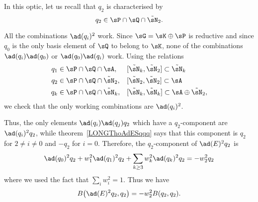 In this optic, let us recall that $q_2$ is characterised by
\begin{equation}
	q_2\in\sP\cap\sQ\cap\tilde\sN_2.
\end{equation}

All the combinations $\ad(q_i)^2$ work. Since $\sG=\sK\oplus\sP$ is reductive and since $q_0$ is the only basis element of $\sQ$ to belong to $\sK$, none of the combinations $\ad(q_i)\ad(q_0)$ or $\ad(q_0)\ad(q_i)$ work. Using the relations
%
\begin{equation}
	\begin{aligned}[]
		q_1 & \in\sP\cap\sQ\cap\sA    ,     &  & [\tilde\sN_k,\tilde\sN_2]\subset\tilde\sN_k           \\
		q_2 & \in\sP\cap\sQ\cap\tilde\sN_2, &  & [\tilde\sN_2,\tilde\sN_2]\subset\sA                   \\
		q_k & \in\sP\cap\sQ\cap\tilde\sN_k, &  & [\tilde\sN_k,\tilde\sN_k]\subset\sA\oplus\tilde\sN_2,
	\end{aligned}
\end{equation}%
%
we check that the only working combinations are $\ad(q_i)^2$.

%

%

%

%

Thus, the only elements $\ad(q_i)\ad(q_j)q_2$ which have a $q_2$-component are $\ad(q_i)^2q_2$, while theorem~\ref{LONGThoAdESqqq} says that this component is $q_2$ for $2\neq i\neq 0$ and $-q_2$ for $i=0$. Therefore, the $q_2$-component of $\ad(E)^2q_2$ is
\begin{equation}
	\ad(q_0)^2q_2+w_1^2\ad(q_1)^2q_2+\sum_{k\geq 3}w_k^2\ad(q_k)^2q_2=-w_2^2q_2
\end{equation}
where we used the fact that $\sum_i w_i^2=1$. Thus we have
\begin{equation}        \label{LONGEqBeDeuxqqwDeux}
	B\big( \ad(E)^2q_2,q_2 \big)=-w_2^2B(q_2,q_2).
\end{equation}

